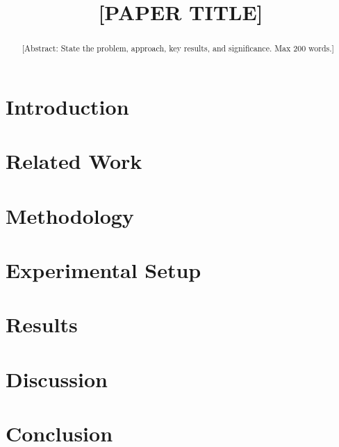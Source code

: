 \documentclass[conference]{IEEEtran}
\title{[PAPER TITLE]}
\author{
  \IEEEauthorblockN{[Author 1]}
  \IEEEauthorblockA{[Affiliation] \\ [Email]}
  \and
  \IEEEauthorblockN{[Author 2]}
  \IEEEauthorblockA{[Affiliation] \\ [Email]}
}
\begin{document}
\maketitle

\begin{abstract}
[Abstract: State the problem, approach, key results, and significance. Max 200 words.]
\end{abstract}

\begin{IEEEkeywords}
\end{IEEEkeywords}

\section{Introduction}

\section{Related Work}

\section{Methodology}

\section{Experimental Setup}

\section{Results}

\section{Discussion}

\section{Conclusion}



\end{document}

